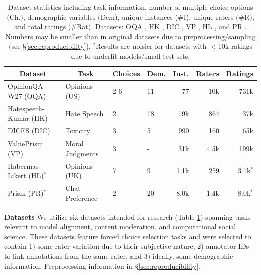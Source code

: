 \documentclass[11pt]{article}
\begin{document}
\begin{table}[h]
\centering
\small
\begin{tabular}{llllrrr}
\toprule
\multicolumn{1}{c}{\bf Dataset}  &\multicolumn{1}{c}{\bf Task}  &\multicolumn{1}{c}{\bf Choices}   &\multicolumn{1}{c}{\bf Dem.}   &\multicolumn{1}{c}{\bf Inst.}   &\multicolumn{1}{c}{\bf Raters}   &\multicolumn{1}{c}{\bf Ratings} \\
\hline
OpinionQA W27 (OQA) & Opinions (US) & 2-6 & 11 & 77 & 10k & 731k \\
Hatespeech-Kumar (HK) & Hate Speech & 2 & 18 & 19k & 864 & 37k \\
DICES (DIC) & Toxicity & 3 & 5 & 990 & 160 & 65k \\
ValuePrism (VP) & Moral Judgments & 3 & - & 31k & 4.5k & 199k \\
Habermas-Likert (HL)$^*$ & Opinions (UK) & 7 & 9 & 1.1k & 259 & 3.1k$^*$ \\
Prism (PR)$^*$
& Chat Preference & 2 & 20 & 8.0k & 1.4k & 8.0k$^*$ \\
\hline
\end{tabular}
\small{
\caption{
Dataset statistics including task information, number of multiple choice options (Ch.), demographic variables (Dem), unique instances (\#I), unique raters (\#R), and total ratings (\#Rat). Datasets: OQA \citep{santurkar2023opinionslanguagemodelsreflect}, HK \citep{kumar2021designingtoxiccontentclassification}, DIC \citep{aroyo2023dicesdatasetdiversityconversational}, VP \citep{Sorensen_Jiang_Hwang_Levine_Pyatkin_West_Dziri_Lu_Rao_Bhagavatula_Sap_Tasioulas_Choi_2024}, HL \citep{habermas}, and PR \citep{kirk2024prismalignmentdatasetparticipatory}. Numbers may be smaller than in original datasets due to preprocessing/sampling (see \S\ref{sec:reproducibility}).
$^*$Results are noisier for datasets with $<$10k ratings due to underfit models/small test sets.
}
\label{tab:dataset_statistics}
}
\end{table}

\textbf{Datasets }
We utilize six datasets 
intended for research
(Table \ref{tab:dataset_statistics}) spanning tasks relevant to model alignment, content moderation, and computational social science. These datasets feature forced choice selection tasks and were selected to contain 1) some rater variation due to their subjective nature, 2) annotator IDs to link annotations from the same rater, and 3) ideally, some demographic information.
Preprocessing information in \S \ref{sec:reproducibility}.
\end{document}
